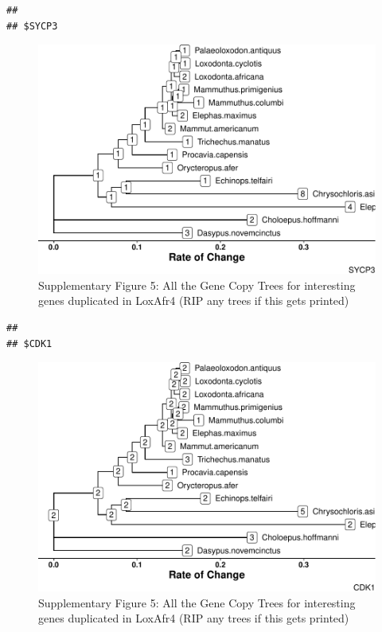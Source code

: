 \documentclass[10pt,letterpaper]{article}
\begin{document}
\begin{verbatim}
## 
## $SYCP3
\end{verbatim}

\begin{figure}
\centering
\includegraphics{paper_PLOS_draft_files/figure-latex/Supplementary Figure 5-6.pdf}
\caption{Supplementary Figure 5: All the Gene Copy Trees for interesting
genes duplicated in LoxAfr4 (RIP any trees if this gets printed)}
\end{figure}

\begin{verbatim}
## 
## $CDK1
\end{verbatim}

\begin{figure}
\centering
\includegraphics{paper_PLOS_draft_files/figure-latex/Supplementary Figure 5-7.pdf}
\caption{Supplementary Figure 5: All the Gene Copy Trees for interesting
genes duplicated in LoxAfr4 (RIP any trees if this gets printed)}
\end{figure}
\end{document}
